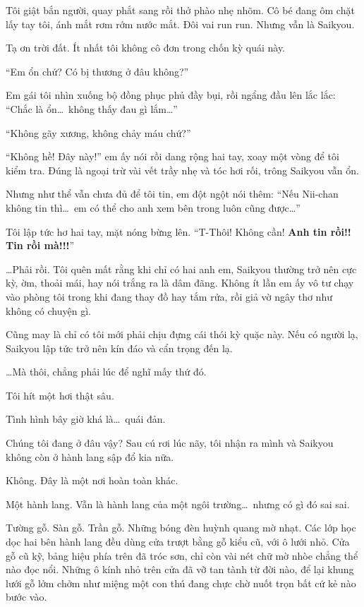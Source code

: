 \documentclass[../main.tex]{subfiles}
\begin{document}
Tôi giật bắn người, quay phắt sang rồi thở phào nhẹ nhõm. Cô bé đang ôm chặt lấy tay tôi, ánh mắt rơm rớm nước mắt. Đôi vai run run. Nhưng vẫn là Saikyou.

Tạ ơn trời đất. Ít nhất tôi không cô đơn trong chốn kỳ quái này.

``Em ổn chứ? Có bị thương ở đâu không?''

Em gái tôi nhìn xuống bộ đồng phục phủ đầy bụi, rồi ngẩng đầu lên lắc lắc: ``Chắc là ổn\dots\ không thấy đau gì lắm\dots''

``Không gãy xương, không chảy máu chứ?''

``Không hề! Đây này!'' em ấy nói rồi dang rộng hai tay, xoay một vòng để tôi kiểm tra. Đúng là ngoại trừ vài vết trầy nhẹ và tóc hơi rối, trông Saikyou vẫn ổn.

Nhưng như thể vẫn chưa đủ để tôi tin, em đột ngột nói thêm: ``Nếu Nii-chan không tin thì\dots\ em có thể cho anh xem bên trong luôn cũng được\dots''

Tôi lập tức hơ hai tay, mặt nóng bừng lên. ``T-Thôi! Không cần! \textbf{Anh tin rồi!! Tin rồi mà!!!}''

\dots Phải rồi. Tôi quên mất rằng khi chỉ có hai anh em, Saikyou thường trở nên cực kỳ, ờm, thoải mái, hay nói trắng ra là dâm đãng. Không ít lần em ấy vô tư chạy vào phòng tôi trong khi đang thay đồ hay tắm rửa, rồi giả vờ ngây thơ như không có chuyện gì.

Cũng may là chỉ có tôi mới phải chịu đựng cái thói kỳ quặc này. Nếu có người lạ, Saikyou lập tức trở nên kín đáo và cẩn trọng đến lạ.

\dots Mà thôi, chẳng phải lúc để nghĩ mấy thứ đó.

Tôi hít một hơi thật sâu.

Tình hình bây giờ khá là\dots\ quái đản.

Chúng tôi đang ở đâu vậy? Sau cú rơi lúc nãy, tôi nhận ra mình và Saikyou không còn ở hành lang sập đổ kia nữa.

Không. Đây là một nơi hoàn toàn khác.

Một hành lang. Vẫn là hành lang của một ngôi trường\dots\ nhưng có gì đó sai sai.


Tường gỗ. Sàn gỗ. Trần gỗ. Những bóng đèn huỳnh quang mờ nhạt. Các lớp học dọc hai bên hành lang đều dùng cửa trượt bằng gỗ kiểu cũ, với ô lưới nhỏ. Cửa gỗ cũ kỹ, bảng hiệu phía trên đã tróc sơn, chỉ còn vài nét chữ mờ nhòe chẳng thể nào đọc nổi. Những ô kính nhỏ trên cửa đã vỡ tan tành từ đời nào, để lại khung lưới gỗ lởm chởm như miệng một con thú đang chực chờ nuốt trọn bất cứ kẻ nào bước vào.
\end{document}
